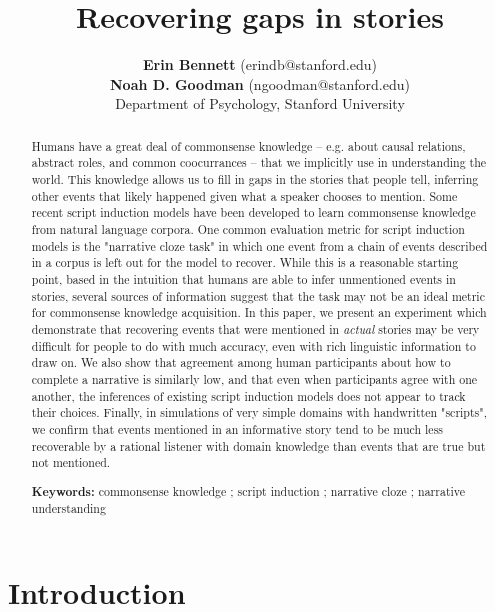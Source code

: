 \documentclass[10pt,a4paper]{article}
\title{Recovering gaps in stories}
\author{{\large \bf Erin Bennett} (erindb@stanford.edu) \\ %
  {\large {\bf Noah D. Goodman}} (ngoodman@stanford.edu) \\
  Department of Psychology, Stanford University}
\begin{document}
\maketitle


\begin{abstract}

Humans have a great deal of commonsense knowledge -- e.g. about causal relations, abstract roles, and common coocurrances -- that we implicitly use in understanding the world.
This knowledge allows us to fill in gaps in the stories that people tell, inferring other events that likely happened given what a speaker chooses to mention.
Some recent script induction models have been developed to learn commonsense knowledge from natural language corpora.
One common evaluation metric for script induction models is the "narrative cloze task" in which one event from a chain of events described in a corpus is left out for the model to recover.
While this is a reasonable starting point, based in the intuition that humans are able to infer unmentioned events in stories, several sources of information suggest that the task may not be an ideal metric for commonsense knowledge acquisition.
In this paper, we present an experiment which demonstrate that recovering events that were mentioned in {\em actual} stories may be very difficult for people to do with much accuracy, even with rich linguistic information to draw on.
We also show that agreement among human participants about how to complete a narrative is similarly low, and that even when participants agree with one another, the inferences of existing script induction models does not appear to track their choices.
Finally, in simulations of very simple domains with handwritten "scripts", we confirm that events mentioned in an informative story tend to be much less recoverable by a rational listener with domain knowledge than events that are true but not mentioned.

\textbf{Keywords:} 
commonsense knowledge ; script induction ; narrative cloze ; narrative understanding
\end{abstract}

\section{Introduction}
\end{document}
